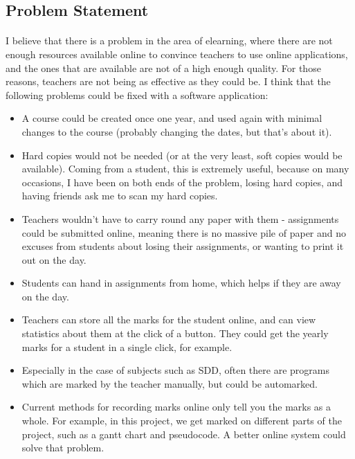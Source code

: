 \subsection{Problem Statement}
\paragraph{}
I believe that there is a problem in the area of elearning, where there are not enough resources available online to convince teachers to use online applications, and the ones that are available are not of a high enough quality. For those reasons, teachers are not being as effective as they could be. I think that the following problems could be fixed with a software application:
\begin{itemize}
	\item A course could be created once one year, and used again with minimal changes to the course (probably changing the dates, but that's about it).
	\item Hard copies would not be needed (or at the very least, soft copies would be available). Coming from a student, this is extremely useful, because on many occasions, I have been on both ends of the problem, losing hard copies, and having friends ask me to scan my hard copies.
	\item Teachers wouldn't have to carry round any paper with them - assignments could be submitted online, meaning there is no massive pile of paper and no excuses from students about losing their assignments, or wanting to print it out on the day.
	\item Students can hand in assignments from home, which helps if they are away on the day.
	\item Teachers can store all the marks for the student online, and can view statistics about them at the click of a button. They could get the yearly marks for a student in a single click, for example.
	\item Especially in the case of subjects such as SDD, often there are programs which are marked by the teacher manually, but could be automarked.
	\item Current methods for recording marks online only tell you the marks as a whole. For example, in this project, we get marked on different parts of the project, such as a gantt chart and pseudocode. A better online system could solve that problem.
\end{itemize}